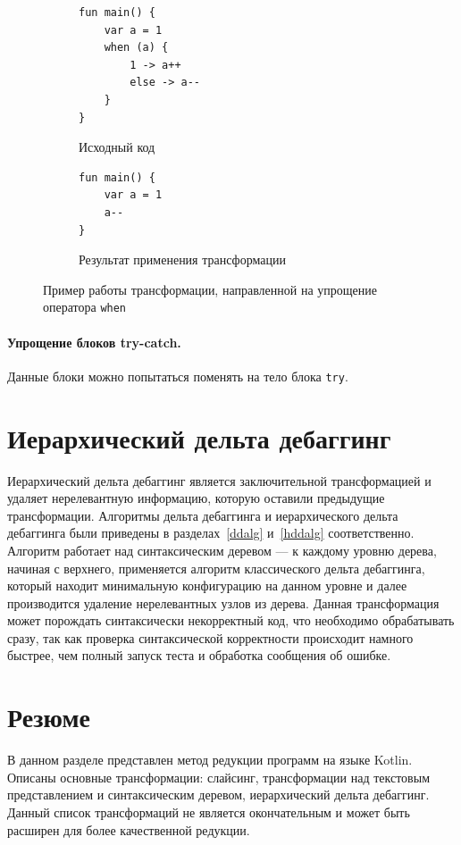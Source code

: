 \begin{figure}
\centering
\begin{subfigure}[t]{\linewidth}
\begin{lstlisting}
fun main() {
    var a = 1
    when (a) {
        1 -> a++
        else -> a--
    }
}
\end{lstlisting}
\caption{Исходный код}
\end{subfigure}
\begin{subfigure}[t]{\linewidth}
\begin{lstlisting}
fun main() {
    var a = 1
    a--
}
\end{lstlisting}
\caption{Результат применения трансформации}
\end{subfigure}
\caption{\label{ex:when}Пример работы трансформации, направленной на упрощение оператора \texttt{when}}
\end{figure}

\paragraph{Упрощение блоков try-catch.} Данные блоки можно попытаться поменять на тело блока \texttt{try}.

\section{Иерархический дельта дебаггинг}
Иерархический дельта дебаггинг является заключительной трансформацией и удаляет нерелевантную информацию, которую оставили предыдущие трансформации. Алгоритмы дельта дебаггинга и иерархического дельта дебаггинга были приведены в разделах~\ref{ddalg} и~\ref{hddalg} соответственно. Алгоритм работает над синтаксическим деревом --- к каждому уровню дерева, начиная с верхнего, применяется алгоритм классического дельта дебаггинга, который находит минимальную конфигурацию на данном уровне и далее производится удаление нерелевантных узлов из дерева. Данная трансформация может порождать синтаксически некорректный код, что необходимо обрабатывать сразу, так как проверка синтаксической корректности происходит намного быстрее, чем полный запуск теста и обработка сообщения об ошибке.

\section{Резюме}
В данном разделе представлен метод редукции программ на языке Kotlin. Описаны основные трансформации: слайсинг, трансформации над текстовым представлением и синтаксическим деревом, иерархический дельта дебаггинг. Данный список трансформаций не является окончательным и может быть расширен для более качественной редукции. 